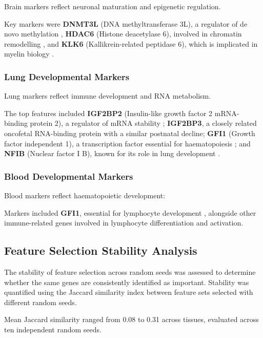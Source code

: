 Brain markers reflect neuronal maturation and epigenetic regulation.

Key markers were \textbf{DNMT3L} (DNA methyltransferase 3L), a regulator of de novo methylation \parencite{bourchis_dnmt3l_2001}, \textbf{HDAC6} (Histone deacetylase 6), involved in chromatin remodelling \parencite{hubbert_hdac6_2002}, and \textbf{KLK6} (Kallikrein-related peptidase 6), which is implicated in myelin biology \parencite{scarisbrick_kallikrein_2012}.

\subsubsection{Lung Developmental Markers}

Lung markers reflect immune development and RNA metabolism.

The top features included \textbf{IGF2BP2} (Insulin-like growth factor 2 mRNA-binding protein 2), a regulator of mRNA stability \parencite{li_hmga2-igf2bp2_2012}; \textbf{IGF2BP3}, a closely related oncofetal RNA-binding protein with a similar postnatal decline; \textbf{GFI1} (Growth factor independent 1), a transcription factor essential for haematopoiesis \parencite{van_der_meer_gfi1_2010}; and \textbf{NFIB} (Nuclear factor I B), known for its role in lung development \parencite{steele-perkins_transcription_2005}.

\subsubsection{Blood Developmental Markers}

Blood markers reflect haematopoietic development:

Markers included \textbf{GFI1}, essential for lymphocyte development \parencite{van_der_meer_gfi1_2010}, alongside other immune-related genes involved in lymphocyte differentiation and activation.

\subsection{Feature Selection Stability Analysis}

The stability of feature selection across random seeds was assessed to determine whether the same genes are consistently identified as important. Stability was quantified using the Jaccard similarity index between feature sets selected with different random seeds.

Mean Jaccard similarity ranged from 0.08 to 0.31 across tissues, evaluated across ten independent random seeds.

